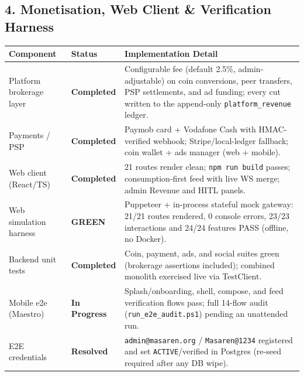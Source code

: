 \documentclass[11pt,a4paper]{article}
\newcommand{\status}[1]{\textcolor{masarengreen}{\bfseries #1}}
\newcommand{\wip}[1]{\textcolor{masarenamber}{\bfseries #1}}
\newcommand{\code}[1]{\texttt{#1}}
\begin{document}
\subsection*{4. Monetisation, Web Client \& Verification Harness}
\begin{tabularx}{\textwidth}{L{4.6cm}L{2.4cm}Y}
\toprule
\textbf{Component} & \textbf{Status} & \textbf{Implementation Detail} \\
\midrule
Platform brokerage layer & \status{Completed} & Configurable fee (default 2.5\%, admin-adjustable) on coin conversions, peer transfers, PSP settlements, and ad funding; every cut written to the append-only \code{platform\_revenue} ledger. \\
\hline
Payments / PSP & \status{Completed} & Paymob card + Vodafone Cash with HMAC-verified webhook; Stripe/local-ledger fallback; coin wallet + ads manager (web + mobile). \\
\hline
Web client (React/TS) & \status{Completed} & 21 routes render clean; \code{npm run build} passes; consumption-first feed with live WS merge; admin Revenue and HITL panels. \\
\hline
Web simulation harness & \status{GREEN} & Puppeteer + in-process stateful mock gateway: 21/21 routes rendered, 0 console errors, 23/23 interactions and 24/24 features PASS (offline, no Docker). \\
\hline
Backend unit tests & \status{Completed} & Coin, payment, ads, and social suites green (brokerage assertions included); combined monolith exercised live via TestClient. \\
\hline
Mobile e2e (Maestro) & \wip{In Progress} & Splash/onboarding, shell, compose, and feed verification flows pass; full 14-flow audit (\code{run\_e2e\_audit.ps1}) pending an unattended run. \\
\hline
E2E credentials & \status{Resolved} & \code{admin@masaren.org} / \code{Masaren@1234} registered and set \code{ACTIVE}/verified in Postgres (re-seed required after any DB wipe). \\
\bottomrule
\end{tabularx}

\vspace{0.6em}
\end{document}

